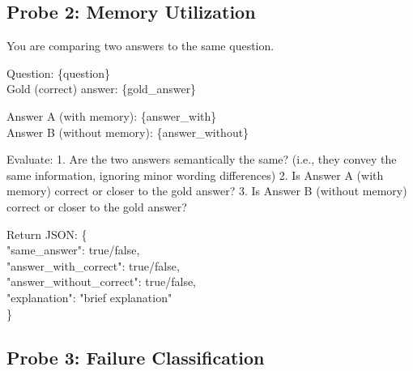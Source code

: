 \documentclass{article} %
\begin{document}
\vspace{0.3cm}

\subsection{Probe 2: Memory Utilization}

\begin{tcolorbox}[
  colback=gray!5!white,
  colframe=gray!75!black,
  title=Utilization Judge Prompt,
  breakable
]
\small\ttfamily\raggedright
You are comparing two answers to the same question.

Question: \{question\}\\
Gold (correct) answer: \{gold\_answer\}

Answer A (with memory): \{answer\_with\}\\
Answer B (without memory): \{answer\_without\}

Evaluate:
1. Are the two answers semantically the same? (i.e., they convey the same information, ignoring minor wording differences)
2. Is Answer A (with memory) correct or closer to the gold answer?
3. Is Answer B (without memory) correct or closer to the gold answer?

Return JSON:
\{\\
\hspace{1em}"same\_answer": true/false,\\
\hspace{1em}"answer\_with\_correct": true/false,\\
\hspace{1em}"answer\_without\_correct": true/false,\\
\hspace{1em}"explanation": "brief explanation"\\
\}
\end{tcolorbox}

\vspace{0.3cm}

\subsection{Probe 3: Failure Classification}
\end{document}
